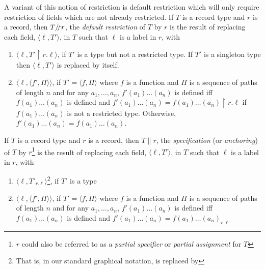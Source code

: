 A variant of this notion of restriction is default restriction
which will only require restriction of fields which are not already
restricted. If $T$ is a record type and $r$ is a record, then
$T\drestr r$, the
\textit{default restriction} of $T$ by
$r$ is the result
of replacing each field, $\langle \ell, T'\rangle$, in $T$ such that
$\ell$ is a label in $r$, with 
\begin{enumerate}
\item  $\langle\ell,T'\!\restriction\!r.\ell\rangle$, if
$T'$ is a type but not a restricted type. If $T'$ is a
singleton type then $\langle \ell, T'\rangle$ is replaced by itself.
\item $\langle\ell,\langle f',\Pi\rangle\rangle$, if $T'=\langle
  f,\Pi\rangle$ where $f$ is a function and $\Pi$ is a sequence of
  paths of length $n$ and for any
  $a_1,\ldots,a_n$, $f'(a_1)\ldots(a_n)$ is defined iff
  $f(a_1)\ldots(a_n)$ is defined and $f'(a_1)\ldots(a_n) =
  f(a_1)\ldots(a_n)\!\restriction\!r.\ell$ if $f(a_1)\ldots(a_n)$ is not a
  restricted type. Otherwise, $f'(a_1)\ldots(a_n) =
  f(a_1)\ldots(a_n)$.
\end{enumerate}  


If $T$ is a record type and $r$ is a record, then $T\parallel r$, the
\textit{specification} (or \textit{anchoring}) of $T$ by
$r$\footnote{$r$ could also be referred to as a \textit{partial
    specifier} or \textit{partial assignment} for $T$} is the result
of replacing each field, $\langle \ell, T'\rangle$, in $T$ such that
$\ell$ is a label in $r$, with 
\begin{enumerate}
\item  $\langle\ell,T'_{r.\ell}\rangle$\footnote{That is, in our
standard graphical notation,  is
replaced by }, if
$T'$ is a type
\item $\langle\ell,\langle f',\Pi\rangle\rangle$, if $T'=\langle
  f,\Pi\rangle$ where $f$ is a function and $\Pi$ is a sequence of
  paths of length $n$ and for any
  $a_1,\ldots,a_n$, $f'(a_1)\ldots(a_n)$ is defined iff
  $f(a_1)\ldots(a_n)$ is defined and $f'(a_1)\ldots(a_n) =
  f(a_1)\ldots(a_n)_{r.\ell}$
\end{enumerate}

